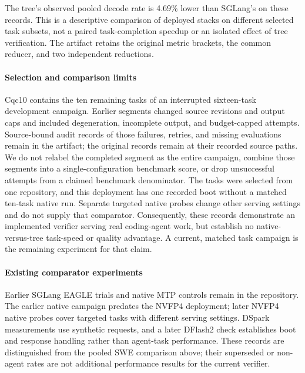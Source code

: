 The tree's observed pooled decode rate is 4.69\% lower than SGLang's on these records. This is a descriptive comparison of deployed stacks on different selected task subsets, not a paired task-completion speedup or an isolated effect of tree verification. The artifact retains the original metric brackets, the common reducer, and two independent reductions.

\paragraph{Selection and comparison limits}
Cqc10 contains the ten remaining tasks of an interrupted sixteen-task development campaign. Earlier segments changed source revisions and output caps and included degeneration, incomplete output, and budget-capped attempts. Source-bound audit records of those failures, retries, and missing evaluations remain in the artifact; the original records remain at their recorded source paths. We do not relabel the completed segment as the entire campaign, combine those segments into a single-configuration benchmark score, or drop unsuccessful attempts from a claimed benchmark denominator. The tasks were selected from one repository, and this deployment has one recorded boot without a matched ten-task native run. Separate targeted native probes change other serving settings and do not supply that comparator. Consequently, these records demonstrate an implemented verifier serving real coding-agent work, but establish no native-versus-tree task-speed or quality advantage. A current, matched task campaign is the remaining experiment for that claim.


\paragraph{Existing comparator experiments}
Earlier SGLang EAGLE trials and native MTP controls remain in the repository. The earlier native campaign predates the NVFP4 deployment; later NVFP4 native probes cover targeted tasks with different serving settings. DSpark measurements use synthetic requests, and a later DFlash2 check establishes boot and response handling rather than agent-task performance. These records are distinguished from the pooled SWE comparison above; their superseded or non-agent rates are not additional performance results for the current verifier.
